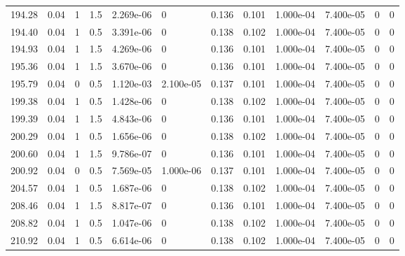 \documentclass[preview]{standalone}
\begin{document}
{{{\begin{tabular}{L{1.2cm}C{1.2cm} C{0.3cm}C{0.5cm} C{1.4cm}C{1.4cm} C{1.4cm}C{1.4cm} C{1.6cm}C{1.6cm} C{1.6cm}C{1.6cm}}
  194.28  &  0.04  & 1     & 1.5 &  2.269e-06  & 0  &  0.136&   0.101& 1.000e-04 & 7.400e-05   &  0 & 0  \\ 
  194.40  &  0.04  & 1     & 0.5 &  3.391e-06  & 0  &  0.138&   0.102& 1.000e-04 & 7.400e-05   &  0 & 0  \\ 
  194.93  &  0.04  & 1     & 1.5 &  4.269e-06  & 0  &  0.136&   0.101& 1.000e-04 & 7.400e-05   &  0 & 0  \\ 
  195.36  &  0.04  & 1     & 1.5 &  3.670e-06  & 0  &  0.136&   0.101& 1.000e-04 & 7.400e-05   &  0 & 0  \\ 
  195.79  &  0.04  & 0     & 0.5 &  1.120e-03  & 2.100e-05  &  0.137&   0.101& 1.000e-04 & 7.400e-05   &  0 & 0  \\ 
  199.38  &  0.04  & 1     & 0.5 &  1.428e-06  & 0  &  0.138&   0.102& 1.000e-04 & 7.400e-05   &  0 & 0  \\ 
  199.39  &  0.04  & 1     & 1.5 &  4.843e-06  & 0  &  0.136&   0.101& 1.000e-04 & 7.400e-05   &  0 & 0  \\ 
  200.29  &  0.04  & 1     & 0.5 &  1.656e-06  & 0  &  0.138&   0.102& 1.000e-04 & 7.400e-05   &  0 & 0  \\ 
  200.60  &  0.04  & 1     & 1.5 &  9.786e-07  & 0  &  0.136&   0.101& 1.000e-04 & 7.400e-05   &  0 & 0  \\ 
  200.92  &  0.04  & 0     & 0.5 &  7.569e-05  & 1.000e-06  &  0.137&   0.101& 1.000e-04 & 7.400e-05   &  0 & 0  \\ 
  204.57  &  0.04  & 1     & 0.5 &  1.687e-06  & 0  &  0.138&   0.102& 1.000e-04 & 7.400e-05   &  0 & 0  \\ 
  208.46  &  0.04  & 1     & 1.5 &  8.817e-07  & 0  &  0.136&   0.101& 1.000e-04 & 7.400e-05   &  0 & 0  \\ 
  208.82  &  0.04  & 1     & 0.5 &  1.047e-06  & 0  &  0.138&   0.102& 1.000e-04 & 7.400e-05   &  0 & 0  \\ 
  210.92  &  0.04  & 1     & 0.5 &  6.614e-06  & 0  &  0.138&   0.102& 1.000e-04 & 7.400e-05   &  0 & 0  \\ 
\hline 
\end{tabular} 

}}}
\end{document}
